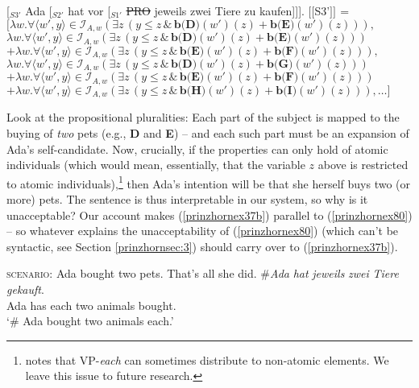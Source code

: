 \documentclass[output=paper,colorlinks,citecolor=brown,
]{langscibook}
\newcommand{\sem}[2]{\mbox{$[\![${#2}$]\!]^{#1}$}} %
\begin{document}
\ea
\ea  \label{prinzhornex63a} [$_{S3'}$ Ada [$_{S2'}$ hat vor [$_{S1'}$ \sout{PRO} jeweils zwei Tiere zu kaufen]]].
\ex \sem{}{S3'} = $[\lambda w.  \forall \langle w' ,y \rangle \in \mathcal{I}_{A,w} (\exists  z \,(y \le z\, \& \,\textbf{b(D)}(w')(z)+\textbf{b(E)}(w')(z))),$\\$
\lambda w.  \forall \langle w' ,y \rangle \in \mathcal{I}_{A,w} (\exists  z \,(y \le z\, \& \,\textbf{b(D)}(w')(z)+\textbf{b(E)}(w')(z))) $\\$
+ \lambda w.  \forall \langle w' ,y \rangle \in \mathcal{I}_{A,w} (\exists  z \,(y \le z\, \& \,\textbf{b(E)}(w')(z)+\textbf{b(F)}(w')(z))), $\\$
\lambda w.  \forall \langle w' ,y \rangle \in \mathcal{I}_{A,w} (\exists z\,( y \le z\, \& \,\textbf{b(D)}(w')(z) + \textbf{b(G)}(w')(z)))$\\$ + \lambda w.  \forall \langle w' ,y \rangle \in \mathcal{I}_{A,w} (\exists z \, (y \le z\,\& \,\textbf{b(E)}(w')(z)+\textbf{b(F)}(w')(z))) $\\$ + \lambda w.  \forall \langle w' ,y \rangle \in \mathcal{I}_{A,w} (\exists z \,(y \le z\, \& \,\textbf{b(H)}(w')(z)+\textbf{b(I)}(w')(z))), \dots]$\label{prinzhornex63b}
\z\z

Look at the propositional pluralities: Each part of the subject is mapped  to the buying of \textit{two} pets (e.g., {\bf D} and {\bf E}) -- and each such part must be an expansion of Ada's self-candidate. Now, crucially, if the properties can only hold of atomic individuals (which would mean, essentially, that the variable $z$ above is restricted to atomic individuals),\footnote{\cite{Schwarzschild:1996} notes that VP-\textit{each} can sometimes distribute to non-atomic elements. We leave this issue to future research.} then Ada's intention will be that she herself buys two (or more) pets. The sentence is thus interpretable in our system, so why is it unacceptable? Our account makes (\ref{prinzhornex37b}) parallel to (\ref{prinzhornex80}) -- so whatever explains the unacceptability of (\ref{prinzhornex80}) (which can't be syntactic, see Section \ref{prinzhornsec:3}) should carry over to (\ref{prinzhornex37b}).




\ea 
\ea \textsc{scenario:} Ada bought two pets. That's all she did.
\ex \gll $\#$\textit{Ada} \textit{hat} \textit{jeweils} \textit{zwei} \textit{Tiere} \textit{gekauft}.\\
	Ada has each two animals bought.\\
	\glt `$\#$ Ada bought two animals each.' \label{prinzhornex80}
	\z\z
\end{document}
